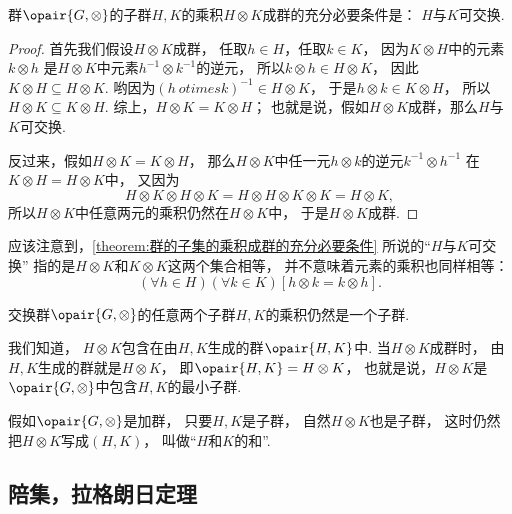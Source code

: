 \begin{theorem}\label{theorem:群的子集的乘积成群的充分必要条件}
群\(\opair{G,\otimes}\)的子群\(H,K\)的乘积\(H \otimes K\)成群的充分必要条件是：
\(H\)与\(K\)可交换.
\begin{proof}
首先我们假设\(H \otimes K\)成群，
任取\(h \in H\)，任取\(k \in K\)，
因为\(K \otimes H\)中的元素\(k \otimes h\)
是\(H \otimes K\)中元素\(h^{-1} \otimes k^{-1}\)的逆元，
所以\(k \otimes h \in H \otimes K\)，
因此\(K \otimes H \subseteq H \otimes K\).
哟因为\((h\ otimes k)^{-1} \in H \otimes K\)，
于是\(h \otimes k \in K \otimes H\)，
所以\(H \otimes K \subseteq K \otimes H\).
综上，\(H \otimes K = K \otimes H\)；
也就是说，假如\(H \otimes K\)成群，那么\(H\)与\(K\)可交换.

反过来，假如\(H \otimes K = K \otimes H\)，
那么\(H \otimes K\)中任一元\(h \otimes k\)的逆元\(k^{-1} \otimes h^{-1}\)
在\(K \otimes H = H \otimes K\)中，
又因为\[
	H \otimes K \otimes H \otimes K
	= H \otimes H \otimes K \otimes K
	= H \otimes K,
\]
所以\(H \otimes K\)中任意两元的乘积仍然在\(H \otimes K\)中，
于是\(H \otimes K\)成群.
\end{proof}
\end{theorem}

应该注意到，\cref{theorem:群的子集的乘积成群的充分必要条件} 所说的“\(H\)与\(K\)可交换”
指的是\(H \otimes K\)和\(K \otimes K\)这两个集合相等，
并不意味着元素的乘积也同样相等：\[
	(\forall h \in H)(\forall k \in K)[h \otimes k = k \otimes h].
\]

\begin{corollary}
交换群\(\opair{G,\otimes}\)的任意两个子群\(H,K\)的乘积仍然是一个子群.
\end{corollary}

我们知道，
\(H \otimes K\)包含在由\(H,K\)生成的群\(\opair{H,K}\)中.
当\(H \otimes K\)成群时，
由\(H,K\)生成的群就是\(H \otimes K\)，
即\(\opair{H,K} = H \otimes K\)，
也就是说，\(H \otimes K\)是\(\opair{G,\otimes}\)中包含\(H,K\)的最小子群.

假如\(\opair{G,\otimes}\)是加群，
只要\(H,K\)是子群，
自然\(H \otimes K\)也是子群，
这时仍然把\(H \otimes K\)写成\((H,K)\)，
叫做“\(H\)和\(K\)的和”.

\subsection{陪集，拉格朗日定理}
\begingroup
\def\RQuotient{G/\kern-2pt\sim}
\def\LQuotient{G/\kern-2pt\backsim}

